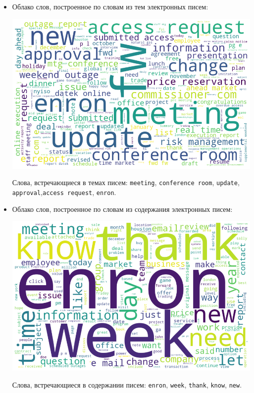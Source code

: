 \begin{itemize}
\item Облако слов, построенное по словам из тем электронных писем:

\begin{center}
\includegraphics[scale=0.5]{pics/enron_wordcloud_subject.png}
\end{center}

Слова, встречающиеся в темах писем: \texttt{meeting}, \texttt{conference room}, \texttt{update}, \texttt{approval},\texttt{access request}, \texttt{enron}.

\item Облако слов, построенное по словам из содержания электронных писем:

\begin{center}
\includegraphics[scale=0.5]{pics/enron_wordcloud_content.png}
\end{center}

Слова, встречающиеся в содержании писем: \texttt{enron}, \texttt{week}, \texttt{thank}, \texttt{know}, \texttt{new}.

\end{itemize}

